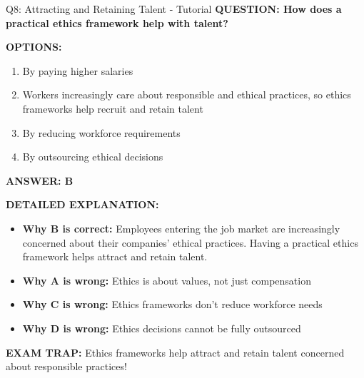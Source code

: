\documentclass[8pt]{beamer}
\begin{document}
	\begin{frame}{Q8: Attracting and Retaining Talent - Tutorial}
		\fontsize{6.5}{7.5}\selectfont
		\textbf{QUESTION: How does a practical ethics framework help with talent?}
		
		\vspace{0.1cm}
		\textbf{OPTIONS:}
		\begin{enumerate}
			\item By paying higher salaries
			\item Workers increasingly care about responsible and ethical practices, so ethics frameworks help recruit and retain talent
			\item By reducing workforce requirements
			\item By outsourcing ethical decisions
		\end{enumerate}
		
		\vspace{0.1cm}
		\textcolor{myblue}{\textbf{ANSWER: B}}
		
		\vspace{0.1cm}
		\textbf{DETAILED EXPLANATION:}
		\begin{itemize}
			\item \textbf{Why B is correct:} Employees entering the job market are increasingly concerned about their companies' ethical practices. Having a practical ethics framework helps attract and retain talent.
			\item \textbf{Why A is wrong:} Ethics is about values, not just compensation
			\item \textbf{Why C is wrong:} Ethics frameworks don't reduce workforce needs
			\item \textbf{Why D is wrong:} Ethics decisions cannot be fully outsourced
		\end{itemize}
		
		\textcolor{myred}{\textbf{EXAM TRAP:}} Ethics frameworks help \textcolor{myblue}{attract and retain talent} concerned about responsible practices!
	\end{frame}
	
\end{document}
